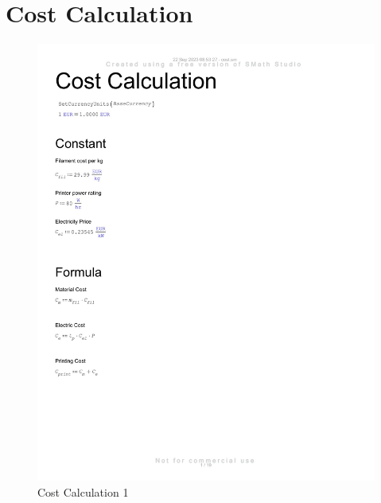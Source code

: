 \section{Cost Calculation}
\label{appendix:cost-calculation}

\begin{figure}[H]
    \centering
    \includegraphics[width=\linewidth]{texs/appendix/data/costcalculation/cost1-01.jpg}
    \caption{Cost Calculation 1}
    \label{fig:cost-calculation-1}
\end{figure}

